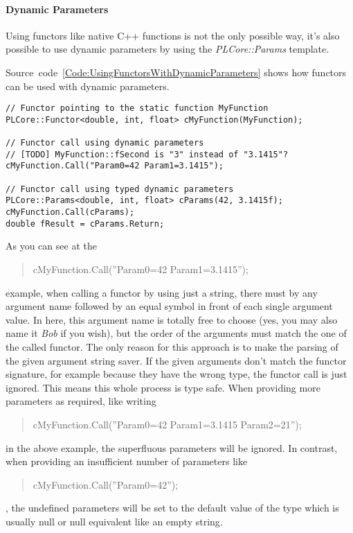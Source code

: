 \paragraph{Dynamic Parameters}
\label{Functions:DynamicParameters}
Using functors like native C++ functions is not the only possible way, it's also possible to use dynamic parameters by using the \emph{PLCore::Params} template.

Source~code~\ref{Code:UsingFunctorsWithDynamicParameters} shows how functors can be used with dynamic parameters.
\begin{lstlisting}[float=htb,label=Code:UsingFunctorsWithDynamicParameters,caption={Using functors with dynamic parameters}]
// Functor pointing to the static function MyFunction
PLCore::Functor<double, int, float> cMyFunction(MyFunction);

// Functor call using dynamic parameters
// [TODO] MyFunction::fSecond is "3" instead of "3.1415"?
cMyFunction.Call("Param0=42 Param1=3.1415");

// Functor call using typed dynamic parameters
PLCore::Params<double, int, float> cParams(42, 3.1415f);
cMyFunction.Call(cParams);
double fResult = cParams.Return;
\end{lstlisting}
As you can see at the \begin{quote}cMyFunction.Call(''Param0=42 Param1=3.1415'');\end{quote} example, when calling a functor by using just a string, there must by any argument name followed by an equal symbol in front of each single argument value. In here, this argument name is totally free to choose (yes, you may also name it \emph{Bob} if you wish), but the order of the arguments must match the one of the called functor. The only reason for this approach is to make the parsing of the given argument string saver. If the given arguments don't match the functor signature, for example because they have the wrong type, the functor call is just ignored. This means this whole process is type safe. When providing more parameters as required, like writing \begin{quote}cMyFunction.Call(''Param0=42 Param1=3.1415 Param2=21'');\end{quote} in the above example, the superfluous parameters will be ignored. In contrast, when providing an insufficient number of parameters like \begin{quote}cMyFunction.Call(''Param0=42'');\end{quote}, the undefined parameters will be set to the default value of the type which is usually null or null equivalent like an empty string.

